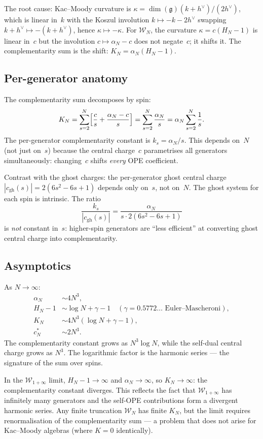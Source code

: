 \documentclass[11pt]{article}
\newcommand{\cW}{\mathcal{W}}
\newcommand{\fg}{\mathfrak{g}}
\begin{document}
The root cause: Kac--Moody curvature is
$\kappa = \dim(\fg)(k + h^\vee)/(2h^\vee)$, which is linear in~$k$
with the Koszul involution $k \mapsto -k - 2h^\vee$ swapping
$k + h^\vee \mapsto -(k + h^\vee)$, hence
$\kappa \mapsto -\kappa$.  For $\cW_N$, the curvature
$\kappa = c(H_N - 1)$ is linear in~$c$ but the involution
$c \mapsto \alpha_N - c$ does not negate~$c$; it shifts it.
The complementarity sum is the shift:
$K_N = \alpha_N(H_N - 1)$.

\subsection*{Per-generator anatomy}

The complementarity sum decomposes by spin:
\[
K_N
= \sum_{s=2}^{N} \Bigl[\frac{c}{s} + \frac{\alpha_N - c}{s}\Bigr]
= \sum_{s=2}^{N} \frac{\alpha_N}{s}
= \alpha_N \sum_{s=2}^{N} \frac{1}{s}.
\]
The per-generator complementarity constant is
$k_s = \alpha_N / s$.  This depends on~$N$ (not just on~$s$)
because the central charge~$c$ parametrises all generators
simultaneously: changing~$c$ shifts \emph{every} OPE coefficient.

Contrast with the ghost charges: the per-generator ghost central
charge $|c_{\mathrm{gh}}(s)| = 2(6s^2 - 6s + 1)$ depends only
on~$s$, not on~$N$.  The ghost system for each spin is
intrinsic.  The ratio
\[
\frac{k_s}{|c_{\mathrm{gh}}(s)|}
= \frac{\alpha_N}{s \cdot 2(6s^2 - 6s + 1)}
\]
is \emph{not} constant in~$s$: higher-spin generators are
``less efficient'' at converting ghost central charge into
complementarity.

\subsection*{Asymptotics}

As $N \to \infty$:
\begin{align*}
\alpha_N &\sim 4N^3, \\
H_N - 1 &\sim \log N + \gamma - 1
  \quad (\gamma = 0.5772\ldots \text{ Euler--Mascheroni}), \\
K_N &\sim 4N^3(\log N + \gamma - 1), \\
c^*_N &\sim 2N^3.
\end{align*}
The complementarity constant grows as $N^3 \log N$,
while the self-dual central charge grows as $N^3$.
The logarithmic factor is the harmonic series --- the
signature of the sum over spins.

\begin{remark}[Connection to the $\cW_\infty$ limit]
In the $\cW_{1+\infty}$ limit, $H_N - 1 \to \infty$ and
$\alpha_N \to \infty$, so $K_N \to \infty$: the
complementarity constant diverges.  This reflects the
fact that $\cW_{1+\infty}$ has infinitely many generators
and the self-OPE contributions form a divergent harmonic
series.  Any finite truncation $\cW_N$ has finite $K_N$,
but the limit requires renormalisation of the
complementarity sum --- a problem that does not arise for
Kac--Moody algebras (where $K = 0$ identically).
\end{remark}
\end{document}
